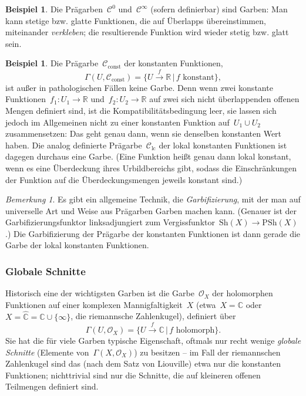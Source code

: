 \documentclass[a4paper,ngerman,12pt]{scrartcl}
\theoremstyle{definition}
\newtheorem{bsp}[defn]{Beispiel}
\theoremstyle{plain}
\theoremstyle{remark}
\newtheorem{bem}[defn]{Bemerkung}
\newcommand{\xra}[1]{\xrightarrow{#1}}
\newcommand{\RR}{\mathbb{R}}
\newcommand{\CC}{\mathbb{C}}
\newcommand{\C}{\mathcal{C}}
\renewcommand{\O}{\mathcal{O}}
\newcommand{\Sh}{\mathrm{Sh}}
\newcommand{\PSh}{\mathrm{PSh}}
\renewcommand{\_}{\mathpunct{.}\,}
\newcommand{\?}{\,{:}\,}
\begin{document}
\begin{bsp}Die Prägarben~$\C^0$ und~$\C^\infty$ (sofern definierbar) sind
Garben: Man kann stetige bzw. glatte Funktionen, die auf Überlapps
übereinstimmen, miteinander \emph{verkleben}; die resultierende Funktion wird
wieder stetig bzw. glatt sein.\end{bsp}

\begin{bsp}Die Prägarbe~$\C_{\text{const}}$ der konstanten Funktionen,
\[ \Gamma(U, \C_{\text{const}}) = \{ U \xra{f} \RR \,|\, \text{$f$ konstant}
\}, \]
ist außer in pathologischen Fällen keine Garbe. Denn wenn zwei konstante
Funktionen~$f_1 : U_1 \to \RR$ und~$f_2 : U_2 \to \RR$ auf zwei sich nicht
überlappenden offenen Mengen definiert sind, ist die Kompatibilitätsbedingung
leer, sie lassen sich jedoch im Allgemeinen nicht zu einer konstanten Funktion
auf~$U_1 \cup U_2$ zusammensetzen: Das geht genau dann, wenn sie denselben
konstanten Wert haben. Die analog definierte Prägarbe~$\C_{\text{lc}}$ der
lokal konstanten Funktionen ist dagegen durchaus eine Garbe. (Eine Funktion heißt genau
dann lokal konstant, wenn es eine Überdeckung ihres Urbildbereichs gibt, sodass
die Einschränkungen der Funktion auf die Überdeckungsmengen jeweils konstant
sind.)\end{bsp}

\begin{bem}Es gibt ein allgemeine Technik, die \emph{Garbifizierung}, mit der
man auf universelle Art und Weise aus Prägarben Garben machen kann. (Genauer
ist der Garbifizierungsfunktor linksadjungiert zum Vergissfunktor~$\Sh(X) \to
\PSh(X)$.) Die Garbifizierung der Prägarbe der konstanten Funktionen ist dann
gerade die Garbe der lokal konstanten Funktionen.\end{bem}


\subsubsection*{Globale Schnitte}

Historisch eine der wichtigsten Garben ist die Garbe~$\O_X$ der holomorphen
Funktionen auf einer komplexen Mannigfaltigkeit~$X$ (etwa~$X = \CC$ oder~$X =
\widehat{\CC} = \CC \cup \{ \infty \}$, die riemannsche Zahlenkugel), definiert
über
\[ \Gamma(U, \O_X) = \{ U \xra{f} \CC \,|\, \text{$f$ holomorph} \}. \]
Sie hat die für viele Garben typische Eigenschaft, oftmals nur recht wenige
\emph{globale Schnitte} (Elemente von~$\Gamma(X,\O_X)$) zu besitzen -- im Fall
der riemannschen Zahlenkugel sind das (nach dem Satz von Liouville) etwa nur
die konstanten Funktionen; nichttrivial sind nur die Schnitte, die auf
kleineren offenen Teilmengen definiert sind.
\end{document}
